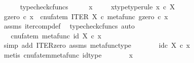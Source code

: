\begin{isabellebody}
\ \ \ \ \isamarkupfalse%
\ typecheck{\isacharunderscore}{\kern0pt}cfuncs\isanewline
{}\isamarkupfalse%
\ \isanewline
\ \ \isamarkupfalse%
\ x\ \isanewline
\ \ \isamarkupfalse%
\ x{\isacharunderscore}{\kern0pt}type{\isacharbrackleft}{\kern0pt}type{\isacharunderscore}{\kern0pt}rule{\isacharbrackright}{\kern0pt}{\isacharcolon}{\kern0pt}\ {\isachardoublequoteopen}x\ {\isasymin}\isactrlsub c\ X{\isachardoublequoteclose}\isanewline
\ \ \isamarkupfalse%
\ {\isachardoublequoteopen}{\isacharparenleft}{\kern0pt}g\isactrlbsup {\isasymcirc}zero\isactrlesup {\isacharparenright}{\kern0pt}\ {\isasymcirc}\isactrlsub c\ x\ {\isacharequal}{\kern0pt}\ {\isacharparenleft}{\kern0pt}cnufatem\ {\isacharparenleft}{\kern0pt}ITER\ X\ {\isasymcirc}\isactrlsub c\ {\isasymlangle}metafunc\ g{\isacharcomma}{\kern0pt}zero{\isasymrangle}{\isacharparenright}{\kern0pt}{\isacharparenright}{\kern0pt}\ {\isasymcirc}\isactrlsub c\ x{\isachardoublequoteclose}\isanewline
\ \ \ \ \isamarkupfalse%
\ assms\ iter{\isacharunderscore}{\kern0pt}comp{\isacharunderscore}{\kern0pt}def{}\ \isamarkupfalse%
\ {\isacharparenleft}{\kern0pt}typecheck{\isacharunderscore}{\kern0pt}cfuncs{\isacharcomma}{\kern0pt}\ auto{\isacharparenright}{\kern0pt}\isanewline
\ \ \isamarkupfalse%
\ \isamarkupfalse%
\ {\isachardoublequoteopen}{\isachardot}{\kern0pt}{\isachardot}{\kern0pt}{\isachardot}{\kern0pt}\ {\isacharequal}{\kern0pt}\ cnufatem\ {\isacharparenleft}{\kern0pt}metafunc\ {\isacharparenleft}{\kern0pt}id\ X{\isacharparenright}{\kern0pt}{\isacharparenright}{\kern0pt}\ {\isasymcirc}\isactrlsub c\ x{\isachardoublequoteclose}\isanewline
\ \ \ \ \isamarkupfalse%
\ {\isacharparenleft}{\kern0pt}simp\ add{\isacharcolon}{\kern0pt}\ ITER{\isacharunderscore}{\kern0pt}zero{\isacharprime}{\kern0pt}\ assms\ metafunc{\isacharunderscore}{\kern0pt}type{\isacharparenright}{\kern0pt}\isanewline
\ \ \isamarkupfalse%
\ \isamarkupfalse%
\ {\isachardoublequoteopen}{\isachardot}{\kern0pt}{\isachardot}{\kern0pt}{\isachardot}{\kern0pt}\ {\isacharequal}{\kern0pt}\ id\isactrlsub c\ X\ {\isasymcirc}\isactrlsub c\ x{\isachardoublequoteclose}\isanewline
\ \ \ \ \isamarkupfalse%
\ {\isacharparenleft}{\kern0pt}metis\ cnufatem{\isacharunderscore}{\kern0pt}metafunc\ id{\isacharunderscore}{\kern0pt}type{\isacharparenright}{\kern0pt}\isanewline
\ \ \isamarkupfalse%
\ \isamarkupfalse%
\ {\isachardoublequoteopen}{\isachardot}{\kern0pt}{\isachardot}{\kern0pt}{\isachardot}{\kern0pt}\ {\isacharequal}{\kern0pt}\ x{\isachardoublequoteclose}\isanewline

\end{isabellebody}
